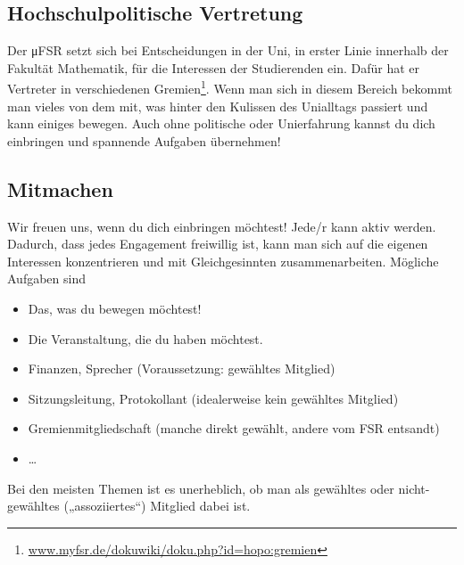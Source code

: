 \documentclass{scrartcl}
\begin{document}
\subsection*{Hochschulpolitische Vertretung}
\label{sub:hochschulpolitische_vertretung}
Der μFSR setzt sich bei Entscheidungen in der Uni, in erster Linie innerhalb der Fakultät Mathematik,
für die Interessen der Studierenden ein.
Dafür hat er Vertreter in verschiedenen Gremien\footnote{\url{www.myfsr.de/dokuwiki/doku.php?id=hopo:gremien}}.
Wenn man sich in diesem Bereich  bekommt man vieles von dem mit, was hinter den Kulissen
des Unialltags passiert und kann einiges bewegen.
Auch ohne politische oder Unierfahrung kannst du dich einbringen und spannende Aufgaben übernehmen!

\subsection*{Mitmachen}
\label{sub:mitmachen}
Wir freuen uns, wenn du dich einbringen möchtest! Jede/r kann aktiv werden.
Dadurch, dass jedes Engagement freiwillig ist, kann man sich auf die eigenen Interessen konzentrieren
und mit Gleichgesinnten zusammenarbeiten. Mögliche Aufgaben sind
\begin{itemize}
  \item Das, was du bewegen möchtest!
  \item Die Veranstaltung, die du haben möchtest.
  \item Finanzen, Sprecher (Voraussetzung: gewähltes Mitglied)
  \item Sitzungsleitung, Protokollant (idealerweise kein gewähltes Mitglied)
  \item Gremienmitgliedschaft (manche direkt gewählt, andere vom FSR entsandt)
  \item \dots
\end{itemize}
Bei den meisten Themen ist es unerheblich, ob man als gewähltes oder nicht-gewähltes („assoziiertes“) Mitglied dabei ist.
\end{document}
